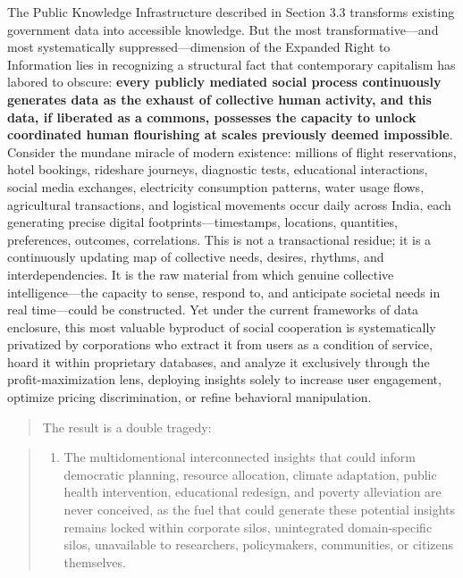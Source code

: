 The Public Knowledge Infrastructure described in Section 3.3 transforms
existing government data into accessible knowledge. But the most
transformative---and most systematically suppressed---dimension of the
Expanded Right to Information lies in recognizing a structural fact that
contemporary capitalism has labored to obscure: \textbf{every publicly
mediated social process continuously generates data as the exhaust of
collective human activity, and this data, if liberated as a commons,
possesses the capacity to unlock coordinated human flourishing at scales
previously deemed impossible}. Consider the mundane miracle of modern
existence: millions of flight reservations, hotel bookings, rideshare
journeys, diagnostic tests, educational interactions, social media
exchanges, electricity consumption patterns, water usage flows,
agricultural transactions, and logistical movements occur daily across
India, each generating precise digital footprints---timestamps,
locations, quantities, preferences, outcomes, correlations. This is not
a transactional residue; it is a continuously updating map of collective
needs, desires, rhythms, and interdependencies. It is the raw material
from which genuine collective intelligence---the capacity to sense,
respond to, and anticipate societal needs in real time---could be
constructed. Yet under the current frameworks of data enclosure, this
most valuable byproduct of social cooperation is systematically
privatized by corporations who extract it from users as a condition of
service, hoard it within proprietary databases, and analyze it
exclusively through the profit-maximization lens, deploying insights
solely to increase user engagement, optimize pricing discrimination, or
refine behavioral manipulation.

\begin{quote}
The result is a double tragedy:
\end{quote}

\begin{quote}
\begin{enumerate}
\def\labelenumi{\arabic{enumi}.}
\tightlist
\item
  The multidomentional interconnected insights that could inform
  democratic planning, resource allocation, climate adaptation, public
  health intervention, educational redesign, and poverty alleviation are
  never conceived, as the fuel that could generate these potential
  insights remains locked within corporate silos, unintegrated
  domain-specific silos, unavailable to researchers, policymakers,
  communities, or citizens themselves.
\end{enumerate}
\end{quote}

